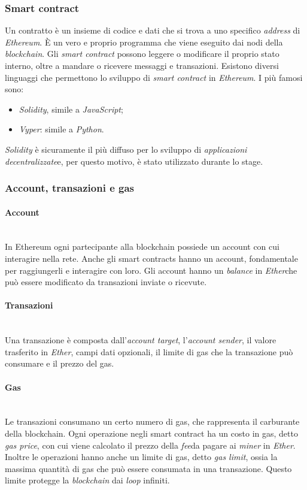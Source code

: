 \subsubsection{Smart contract}
Un contratto è un insieme di codice e dati che si trova a uno specifico \textit{address} di \textit{Ethereum}. È un vero e proprio programma che viene eseguito dai nodi della \textit{blockchain}. Gli \textit{smart contract} possono leggere o modificare il proprio stato interno, oltre a mandare o ricevere messaggi e transazioni. Esistono diversi linguaggi che permettono lo sviluppo di \textit{smart contract} in \textit{Ethereum}. I più famosi sono:
\begin{itemize}
	\item{\textit{Solidity}, simile a \textit{JavaScript};}
	\item{\textit{Vyper}: simile a \textit{Python}.}
\end{itemize}
\textit{Solidity} è sicuramente il più diffuso per lo sviluppo di \emph{\gls{applicazioni decentralizzate}}\glsfirstoccur e, per questo motivo, è stato utilizzato durante lo stage.

\subsubsection{Account, transazioni e gas}
\paragraph{Account}\mbox{}\\
In Ethereum ogni partecipante alla blockchain possiede un account con cui interagire nella rete. Anche gli smart contracts hanno un account, fondamentale per raggiungerli e interagire con loro. Gli account hanno un \textit{balance} in \emph{\gls{Ether}}\glsfirstoccur che può essere modificato da transazioni inviate o ricevute.
\paragraph{Transazioni}\mbox{}\\
Una transazione è composta dall'\textit{account target}, l'\textit{account sender}, il valore trasferito in \textit{Ether}, campi dati opzionali, il limite di gas che la transazione può consumare e il prezzo del gas.
\paragraph{Gas}\mbox{}\\
Le transazioni consumano un certo numero di gas, che rappresenta il carburante della blockchain. Ogni operazione negli smart contract ha un costo in gas, detto \emph{\gls{gas price}}\glsfirstoccur, con cui viene calcolato il prezzo della \emph{\gls{fee}}\glsfirstoccur da pagare ai \textit{miner} in \textit{Ether}. Inoltre le operazioni hanno anche un limite di gas, detto \emph{\gls{gas limit}}\glsfirstoccur, ossia la massima quantità di gas che può essere consumata in una transazione. Questo limite protegge la \textit{blockchain} dai \textit{loop} infiniti.

